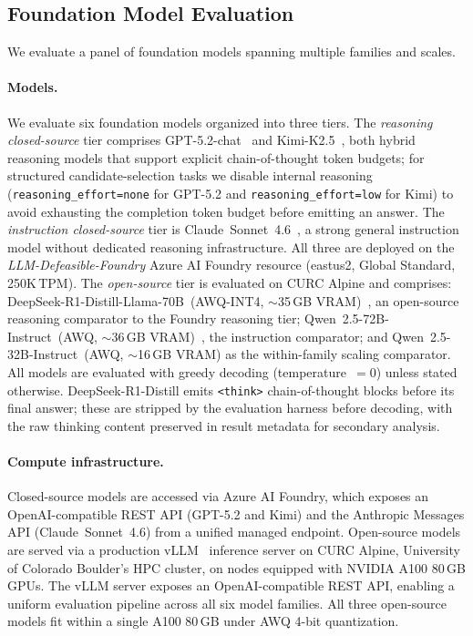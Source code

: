 \documentclass{article}
\theoremstyle{definition}
\begin{document}
\subsection{Foundation Model Evaluation}\label{subsec:evaluation}

We evaluate a panel of foundation models spanning multiple families and scales.

\paragraph{Models.} We evaluate six foundation models organized into three tiers. The \emph{reasoning closed-source} tier comprises GPT-5.2-chat~\cite{openai2025gpt52} and Kimi-K2.5~\cite{moonshot2025kimi}, both hybrid reasoning models that support explicit chain-of-thought token budgets; for structured candidate-selection tasks we disable internal reasoning (\texttt{reasoning\_effort=none} for GPT-5.2 and \texttt{reasoning\_effort=low} for Kimi) to avoid exhausting the completion token budget before emitting an answer. The \emph{instruction closed-source} tier is Claude~Sonnet~4.6~\cite{anthropic2024claude}, a strong general instruction model without dedicated reasoning infrastructure. All three are deployed on the \emph{LLM-Defeasible-Foundry} Azure AI Foundry resource (eastus2, Global Standard, 250K\,TPM). The \emph{open-source} tier is evaluated on CURC Alpine and comprises: DeepSeek-R1-Distill-Llama-70B~(AWQ-INT4, $\sim$35\,GB VRAM)~\cite{deepseek2025r1}, an open-source reasoning comparator to the Foundry reasoning tier; Qwen~2.5-72B-Instruct~(AWQ, $\sim$36\,GB VRAM)~\cite{qwen2024qwen25}, the instruction comparator; and Qwen~2.5-32B-Instruct~(AWQ, $\sim$16\,GB VRAM) as the within-family scaling comparator. All models are evaluated with greedy decoding (temperature~$= 0$) unless stated otherwise. DeepSeek-R1-Distill emits \texttt{<think>} chain-of-thought blocks before its final answer; these are stripped by the evaluation harness before decoding, with the raw thinking content preserved in result metadata for secondary analysis.

\paragraph{Compute infrastructure.} Closed-source models are accessed via Azure AI Foundry, which exposes an OpenAI-compatible REST API (GPT-5.2 and Kimi) and the Anthropic Messages API (Claude~Sonnet~4.6) from a unified managed endpoint. Open-source models are served via a production vLLM~\cite{kwon2023vllm} inference server on CURC Alpine, University of Colorado Boulder's HPC cluster, on nodes equipped with NVIDIA A100 80\,GB GPUs. The vLLM server exposes an OpenAI-compatible REST API, enabling a uniform evaluation pipeline across all six model families. All three open-source models fit within a single A100 80\,GB under AWQ 4-bit quantization.
\end{document}

